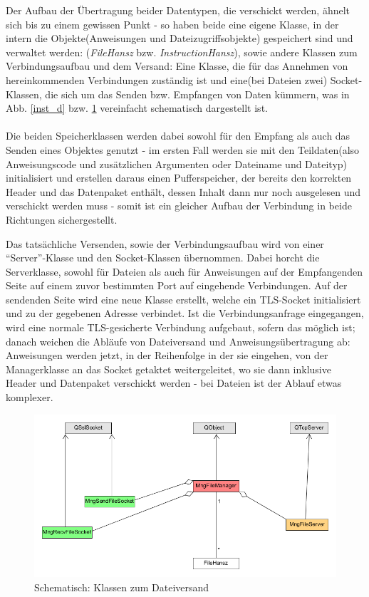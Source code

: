 Der Aufbau der Übertragung beider Datentypen, die verschickt werden, ähnelt sich bis zu einem gewissen Punkt - so haben beide eine eigene Klasse, in der intern die Objekte(Anweisungen und Dateizugriffsobjekte) gespeichert sind und verwaltet werden: (\textit{FileHansz} bzw. \textit{InstructionHansz}), sowie andere Klassen zum Verbindungsaufbau und dem Versand: Eine Klasse, die für das Annehmen von hereinkommenden Verbindungen zuständig ist und eine(bei Dateien zwei) Socket-Klassen, die sich um das Senden bzw. Empfangen von Daten kümmern, was in Abb. \ref{inst_d} bzw. \ref{file_d} vereinfacht schematisch dargestellt ist.\\\\
Die beiden Speicherklassen werden dabei sowohl für den Empfang als auch das Senden eines Objektes genutzt - im ersten Fall werden sie mit den Teildaten(also Anweisungscode und zusätzlichen Argumenten oder Dateiname und Dateityp) initialisiert und erstellen daraus einen Pufferspeicher, der bereits den korrekten Header und das Datenpaket enthält, dessen Inhalt dann nur noch ausgelesen und verschickt werden muss - somit ist ein gleicher Aufbau der Verbindung in beide Richtungen sichergestellt.\par
Das tatsächliche Versenden, sowie der Verbindungsaufbau wird von einer "`Server"'-Klasse und den Socket-Klassen übernommen.
Dabei horcht die Serverklasse, sowohl für Dateien als auch für Anweisungen auf der Empfangenden Seite auf einem zuvor bestimmten Port auf eingehende Verbindungen.
Auf der sendenden Seite wird eine neue Klasse erstellt, welche ein TLS-Socket initialisiert und zu der gegebenen Adresse verbindet.
Ist die Verbindungsanfrage eingegangen, wird eine normale TLS-gesicherte Verbindung aufgebaut, sofern das möglich ist; danach weichen die Abläufe von Dateiversand und Anweisungsübertragung ab: Anweisungen werden jetzt, in der Reihenfolge in der sie eingehen, von der Managerklasse an das Socket getaktet weitergeleitet, wo sie dann inklusive Header und Datenpaket verschickt werden - bei Dateien ist der Ablauf etwas komplexer.\par

\begin{figure}
\includegraphics[scale=.35]{classDiagFile}
\caption{Schematisch: Klassen zum Dateiversand}
\label{file_d}
\end{figure}

